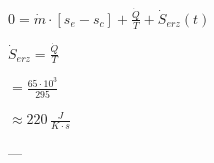 \( 0 = \dot{m} \cdot [s_e - s_c] + \frac{\dot{Q}}{T} + \dot{S}_{erz}(t) \)  

\( \dot{S}_{erz} = \frac{\dot{Q}}{T} \)  

\( = \frac{65 \cdot 10^3}{295} \)  

\( \approx 220 \, \frac{J}{K \cdot s} \)

---